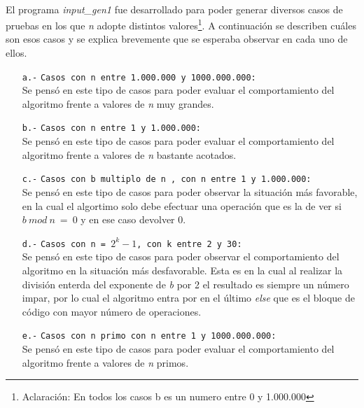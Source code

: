\paragraph{}
El programa \textit{input\_gen1} fue desarrollado para poder generar diversos casos de pruebas en los que \textit{n} adopte distintos valores\footnote{Aclaración: En todos los casos b es un numero entre 0 y 1.000.000}. A continuación se describen cuáles son esos casos y se explica brevemente que se esperaba observar en cada uno de ellos.
	\begin{itemize}
		\item[\texttt{a.-}]{\texttt{Casos con n entre 1.000.000 y 1000.000.000:} \\
		Se pensó en este tipo de casos para poder evaluar el comportamiento del algoritmo frente a valores de \textit{n} muy grandes.}
		\item[\texttt{b.-}]{\texttt{Casos con n entre 1 y 1.000.000:} \\
		Se pensó en este tipo de casos para poder evaluar el comportamiento del algoritmo frente a valores de \textit{n} bastante acotados.}
		\item[\texttt{c.-}]{\texttt{Casos con b multiplo de n , con n entre 1 y 1.000.000:} \\
		Se pensó en este tipo de casos para poder observar la situación más favorable, en la cual el algortimo solo debe efectuar una operación que es la de ver si $b\ mod\ n\ =\ 0$ y en ese caso devolver 0.}
   		\item[\texttt{d.-}]{\texttt{Casos con n = $2^k - 1$, con k entre 2 y 30:} \\
		Se pensó en este tipo de casos para poder observar el comportamiento del algoritmo en la situación más desfavorable. Esta es en la cual al realizar la división enterda del exponente de \textit{b} por 2 el resultado es siempre un número impar, por lo cual el algoritmo entra por en el último \textit{else} que es el bloque de código con mayor número de operaciones.} 
		\item[\texttt{e.-}]{\texttt{Casos con n primo con n entre 1 y 1000.000.000:} \\
		Se pensó en este tipo de casos para poder evaluar el comportamiento del algoritmo frente a valores de \textit{n} primos.}
	\end{itemize}  

